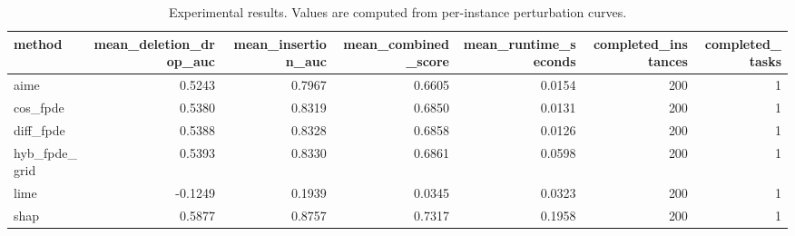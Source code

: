 \begin{table}[t]
\caption{Experimental results. Values are computed from per-instance perturbation curves.}
\label{tab:main_results_computed}
\centering
\begin{tabular}{lrrrrrr}
\toprule
method & mean\_deletion\_drop\_auc & mean\_insertion\_auc & mean\_combined\_score & mean\_runtime\_seconds & completed\_instances & completed\_tasks \\
\midrule
aime & 0.5243 & 0.7967 & 0.6605 & 0.0154 & 200 & 1 \\
cos\_fpde & 0.5380 & 0.8319 & 0.6850 & 0.0131 & 200 & 1 \\
diff\_fpde & 0.5388 & 0.8328 & 0.6858 & 0.0126 & 200 & 1 \\
hyb\_fpde\_grid & 0.5393 & 0.8330 & 0.6861 & 0.0598 & 200 & 1 \\
lime & -0.1249 & 0.1939 & 0.0345 & 0.0323 & 200 & 1 \\
shap & 0.5877 & 0.8757 & 0.7317 & 0.1958 & 200 & 1 \\
\bottomrule
\end{tabular}

\end{table}
